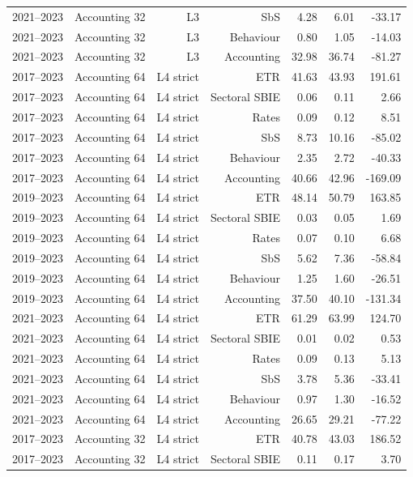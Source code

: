 {\begin{longtable}{@{}lrrrrrr@{}}
2021–2023 & Accounting 32 & L3 & SbS &  4.28 &  6.01 &  -33.17 \\
2021–2023 & Accounting 32 & L3 & Behaviour &  0.80 &  1.05 &  -14.03 \\
2021–2023 & Accounting 32 & L3 & Accounting & 32.98 & 36.74 &  -81.27 \\
2017–2023 & Accounting 64 & L4 strict & ETR & 41.63 & 43.93 &  191.61 \\
2017–2023 & Accounting 64 & L4 strict & Sectoral SBIE &  0.06 &  0.11 &    2.66 \\
2017–2023 & Accounting 64 & L4 strict & Rates &  0.09 &  0.12 &    8.51 \\
2017–2023 & Accounting 64 & L4 strict & SbS &  8.73 & 10.16 &  -85.02 \\
2017–2023 & Accounting 64 & L4 strict & Behaviour &  2.35 &  2.72 &  -40.33 \\
2017–2023 & Accounting 64 & L4 strict & Accounting & 40.66 & 42.96 & -169.09 \\
2019–2023 & Accounting 64 & L4 strict & ETR & 48.14 & 50.79 &  163.85 \\
2019–2023 & Accounting 64 & L4 strict & Sectoral SBIE &  0.03 &  0.05 &    1.69 \\
2019–2023 & Accounting 64 & L4 strict & Rates &  0.07 &  0.10 &    6.68 \\
2019–2023 & Accounting 64 & L4 strict & SbS &  5.62 &  7.36 &  -58.84 \\
2019–2023 & Accounting 64 & L4 strict & Behaviour &  1.25 &  1.60 &  -26.51 \\
2019–2023 & Accounting 64 & L4 strict & Accounting & 37.50 & 40.10 & -131.34 \\
2021–2023 & Accounting 64 & L4 strict & ETR & 61.29 & 63.99 &  124.70 \\
2021–2023 & Accounting 64 & L4 strict & Sectoral SBIE &  0.01 &  0.02 &    0.53 \\
2021–2023 & Accounting 64 & L4 strict & Rates &  0.09 &  0.13 &    5.13 \\
2021–2023 & Accounting 64 & L4 strict & SbS &  3.78 &  5.36 &  -33.41 \\
2021–2023 & Accounting 64 & L4 strict & Behaviour &  0.97 &  1.30 &  -16.52 \\
2021–2023 & Accounting 64 & L4 strict & Accounting & 26.65 & 29.21 &  -77.22 \\
2017–2023 & Accounting 32 & L4 strict & ETR & 40.78 & 43.03 &  186.52 \\
2017–2023 & Accounting 32 & L4 strict & Sectoral SBIE &  0.11 &  0.17 &    3.70 \\

\end{longtable}}
